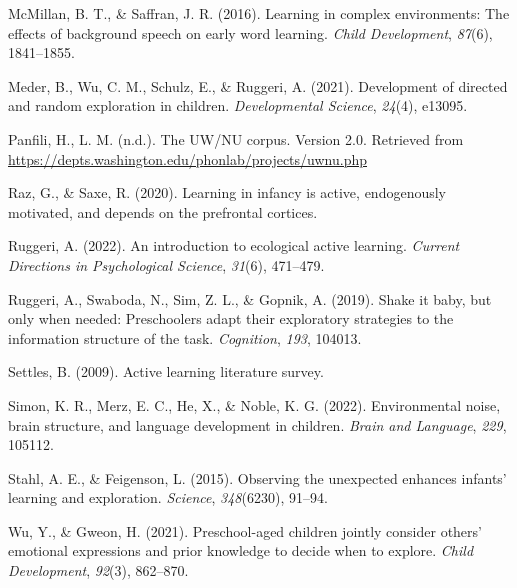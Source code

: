 \documentclass[10pt, letterpaper]{article}
\newenvironment{CSLReferences}%
  {}%
  {\par}
\begin{document}
\begin{CSLReferences}{1}{0}
\leavevmode{}%
McMillan, B. T., \& Saffran, J. R. (2016). Learning in complex
environments: The effects of background speech on early word learning.
\emph{Child Development}, \emph{87}(6), 1841--1855.

\leavevmode{}%
Meder, B., Wu, C. M., Schulz, E., \& Ruggeri, A. (2021). Development of
directed and random exploration in children. \emph{Developmental
Science}, \emph{24}(4), e13095.

\leavevmode{}%
Panfili, H., L. M. (n.d.). The UW/NU corpus. Version 2.0. Retrieved from
\url{https://depts.washington.edu/phonlab/projects/uwnu.php}

\leavevmode{}%
Raz, G., \& Saxe, R. (2020). Learning in infancy is active, endogenously
motivated, and depends on the prefrontal cortices.

\leavevmode{}%
Ruggeri, A. (2022). An introduction to ecological active learning.
\emph{Current Directions in Psychological Science}, \emph{31}(6),
471--479.

\leavevmode{}%
Ruggeri, A., Swaboda, N., Sim, Z. L., \& Gopnik, A. (2019). Shake it
baby, but only when needed: Preschoolers adapt their exploratory
strategies to the information structure of the task. \emph{Cognition},
\emph{193}, 104013.

\leavevmode{}%
Settles, B. (2009). Active learning literature survey.

\leavevmode{}%
Simon, K. R., Merz, E. C., He, X., \& Noble, K. G. (2022). Environmental
noise, brain structure, and language development in children.
\emph{Brain and Language}, \emph{229}, 105112.

\leavevmode{}%
Stahl, A. E., \& Feigenson, L. (2015). Observing the unexpected enhances
infants' learning and exploration. \emph{Science}, \emph{348}(6230),
91--94.

\leavevmode{}%
Wu, Y., \& Gweon, H. (2021). Preschool-aged children jointly consider
others' emotional expressions and prior knowledge to decide when to
explore. \emph{Child Development}, \emph{92}(3), 862--870.

\end{CSLReferences}


\end{document}
